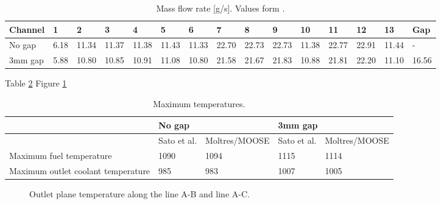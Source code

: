 \begin{table}[htbp!]
\centering
  \caption{Mass flow rate [g/s]. Values form \cite{sato_computational_2010}.}
  \label{tab:th-val-assem-massflow}
  \begin{tabular}{lllllllllllllll}
\toprule
Channel & 1 & 2 & 3 & 4 & 5 & 6 & 7 & 8 & 9 & 10 & 11 & 12 & 13 & Gap \\
\midrule
No gap  & 6.18 & 11.34 & 11.37 & 11.38 & 11.43 & 11.33 & 22.70 & 22.73 & 22.73 & 11.38 & 22.77 & 22.91 & 11.44 & -     \\
3mm gap & 5.88 & 10.80 & 10.85 & 10.91 & 11.08 & 10.80 & 21.58 & 21.67 & 21.83 & 10.88 & 21.81 & 22.20 & 11.10 & 16.56 \\
\bottomrule
\end{tabular}
\end{table}

Table \ref{tab:th-val-assem-results}
Figure \ref{fig:th-val-assem-temps}

\begin{table}[htbp!]
  \centering
  \caption{Maximum temperatures.}
  \label{tab:th-val-assem-results}
\begin{tabular}{l|ll|ll}
\toprule
                                   & \multicolumn{2}{l|}{No gap} & \multicolumn{2}{l}{3mm gap} \\ \midrule
                                   & Sato et al. & Moltres/MOOSE & Sato et al. & Moltres/MOOSE \\ \midrule
Maximum fuel temperature           & 1090    & 1094              & 1115     & 1114             \\
Maximum outlet coolant temperature & 985     & 983               & 1007     & 1005               
\bottomrule
\end{tabular}
\end{table}

\begin{figure}[htbp!]
  \centering
  \hfill
  \caption{Outlet plane temperature along the line A-B and line A-C.}
  \label{fig:th-val-assem-temps}
\end{figure}




